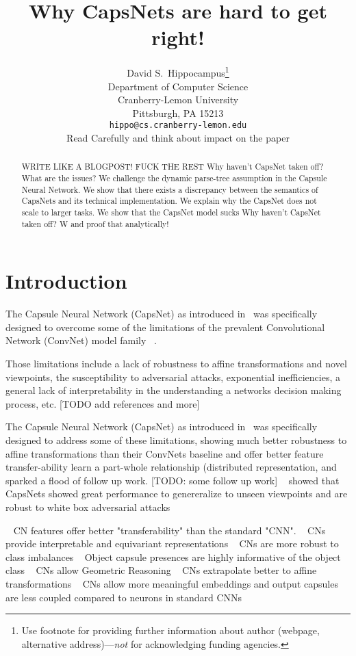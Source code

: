 \documentclass{article}
\title{                                                                                                                                          
	Why CapsNets are hard to get right!
}
\author{%
  David S.~Hippocampus\thanks{Use footnote for providing further information
    about author (webpage, alternative address)---\emph{not} for acknowledging
    funding agencies.} \\
  Department of Computer Science\\
  Cranberry-Lemon University\\
  Pittsburgh, PA 15213 \\
  \texttt{hippo@cs.cranberry-lemon.edu} \\Read Carefully and think about impact on the paper
}
\begin{document}
\maketitle

\begin{abstract}
  WRITE LIKE A BLOGPOST! FUCK THE REST 
  Why haven't CapsNet taken off? What are the issues?
  We challenge the dynamic parse-tree assumption in the Capsule Neural Network.
  We show that there exists a discrepancy between the semantics of CapsNets and its technical implementation.
  We explain why the CapsNet does not scale to larger tasks.
  We show that the CapsNet model sucks
  Why haven't CapsNet taken off? W and proof that analytically!
\end{abstract}

\section{Introduction}

The Capsule Neural Network (CapsNet) as introduced in~\cite{nips/SabourFH17} was specifically designed to overcome some of the limitations of the prevalent Convolutional Network (ConvNet) model family ~\cite{neco/LeCunBDHHHJ89}.

Those limitations include a lack of robustness to affine transformations and novel viewpoints,
the susceptibility to adversarial attacks,
exponential inefficiencies,
a general lack of interpretability in the understanding a networks decision making process, etc. [TODO add references and more]

The Capsule Neural Network (CapsNet) as introduced in~\cite{nips/SabourFH17} was specifically designed to address some of these limitations, showing much better robustness to affine transformations than their ConvNets baseline and offer better feature transfer-ability learn a part-whole relationship (distributed representation, and sparked a flood of follow up work. [TODO: some follow up work]
~\cite{iclr/HintonSF18} showed that CapsNets showed great performance to genereralize to unseen viewpoints and are robust to white box adversarial attacks

~\cite{corr/Ancheng2018} CN features offer better "transferability" than the standard "CNN". 
~\cite{nips/LenssenFL18} CNs provide interpretable and equivariant representations
~\cite{miccai/Jimenez-Sanchez18} CNs are more robust to class imbalances
~\cite{nips/KosiorekSTH19} Object capsule presences are highly informative of the object class
~\cite{nips/KosiorekSTH19} CNs allow Geometric Reasoning
~\cite{cvpr/GuT20} CNs extrapolate better to affine transformations
~\cite{corr/Lin2018} CNs allow more meaningful embeddings and output capsules are less coupled compared to neurons in standard CNNs
\end{document}
